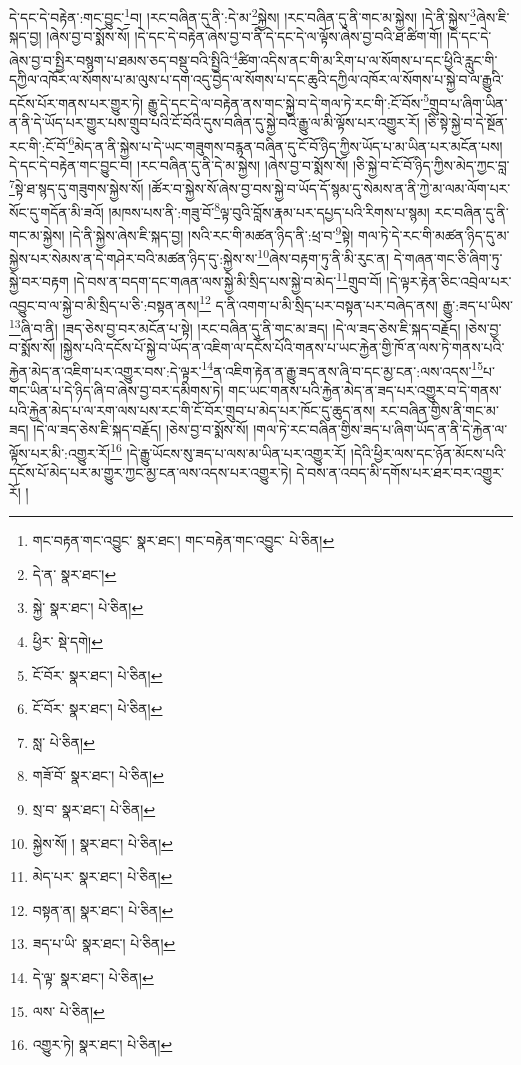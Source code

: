 དེ་དང་དེ་བརྟེན་:གང་བྱུང་\footnote{གང་བརྟན་གང་འབྱུང་  སྣར་ཐང་། གང་བརྟེན་གང་འབྱུང་  པེ་ཅིན། }བ། །རང་བཞིན་དུ་ནི་:དེ་མ་\footnote{དེ་ན་  སྣར་ཐང་། }སྐྱེས། །རང་བཞིན་དུ་ནི་གང་མ་སྐྱེས། །དེ་ནི་སྐྱེས་\footnote{སྐྱེ་  སྣར་ཐང་།  པེ་ཅིན། }ཞེས་ཇི་སྐད་བྱ། །ཞེས་བྱ་བ་སྨོས་སོ། །དེ་དང་དེ་བརྟེན་ཞེས་བྱ་བ་ནི་དེ་དང་དེ་ལ་ལྟོས་ཞེས་བྱ་བའི་ཐ་ཚིག་གོ། །དེ་དང་དེ་ཞེས་བྱ་བ་སྤྱིར་བསྙག་པ་ཐམས་ཅད་བསྡུ་བའི་སྤྱིའི་\footnote{ཕྱིར་  སྡེ་དགེ། }ཚིག་འདིས་ནང་གི་མ་རིག་པ་ལ་སོགས་པ་དང་ཕྱིའི་རླུང་གི་དཀྱིལ་འཁོར་ལ་སོགས་པ་མ་ལུས་པ་དག་འདུ་བྱེད་ལ་སོགས་པ་དང་ཆུའི་དཀྱིལ་འཁོར་ལ་སོགས་པ་སྐྱེ་བ་ལ་རྒྱུའི་དངོས་པོར་གནས་པར་གྱུར་ཏེ། རྒྱུ་དེ་དང་དེ་ལ་བརྟེན་ནས་གང་སྐྱེ་བ་དེ་གལ་ཏེ་རང་གི་:ངོ་བོས་\footnote{ངོ་བོར་  སྣར་ཐང་།  པེ་ཅིན། }གྲུབ་པ་ཞིག་ཡིན་ན་ནི་དེ་ཡོད་པར་གྱུར་པས་གྲུབ་པའི་ངོ་བོའི་དུས་བཞིན་དུ་སྐྱེ་བའི་རྒྱུ་ལ་མི་ལྟོས་པར་འགྱུར་རོ། །ཅི་སྟེ་སྐྱེ་བ་དེ་སྔོན་རང་གི་:ངོ་བོ་\footnote{ངོ་བོར་  སྣར་ཐང་།  པེ་ཅིན། }མེད་ན་ནི་སྐྱེས་པ་དེ་ཡང་གཟུགས་བརྙན་བཞིན་དུ་ངོ་བོ་ཉིད་ཀྱིས་ཡོད་པ་མ་ཡིན་པར་མངོན་པས། དེ་དང་དེ་བརྟེན་གང་བྱུང་བ། །རང་བཞིན་དུ་ནི་དེ་མ་སྐྱེས། །ཞེས་བྱ་བ་སྨོས་སོ། །ཅི་སྐྱེ་བ་ངོ་བོ་ཉིད་ཀྱིས་མེད་ཀྱང་བླ་\footnote{སླ་  པེ་ཅིན། }སྟེ་ཐ་སྙད་དུ་གཟུགས་སྐྱེས་སོ། །ཚོར་བ་སྐྱེས་སོ་ཞེས་བྱ་བས་སྐྱེ་བ་ཡོད་དོ་སྙམ་དུ་སེམས་ན་ནི་ཀྱེ་མ་ལམ་ལོག་པར་སོང་དུ་གདོན་མི་ཟའོ། །མཁས་པས་ནི་:གཟུ་བོ་\footnote{གཟོ་བོ་  སྣར་ཐང་།  པེ་ཅིན། }ལྟ་བུའི་བློས་རྣམ་པར་དཔྱད་པའི་རིགས་པ་སྙམ། རང་བཞིན་དུ་ནི་གང་མ་སྐྱེས། །དེ་ནི་སྐྱེས་ཞེས་ཇི་སྐད་བྱ། །སའི་རང་གི་མཚན་ཉིད་ནི་:ཕྲ་བ་\footnote{སྲ་བ་  སྣར་ཐང་།  པེ་ཅིན། }སྟེ། གལ་ཏེ་དེ་རང་གི་མཚན་ཉིད་དུ་མ་སྐྱེས་པར་སེམས་ན་དེ་གཤེར་བའི་མཚན་ཉིད་དུ་:སྐྱེས་ས་\footnote{སྐྱེས་སོ། །  སྣར་ཐང་།  པེ་ཅིན། }ཞེས་བརྟག་ཏུ་ནི་མི་རུང་ན། དེ་གཞན་གང་ཅི་ཞིག་ཏུ་སྐྱེ་བར་བརྟག །དེ་བས་ན་བདག་དང་གཞན་ལས་སྐྱེ་མི་སྲིད་པས་སྐྱེ་བ་མེད་\footnote{མེད་པར་  སྣར་ཐང་།  པེ་ཅིན། }གྲུབ་བོ། །དེ་ལྟར་རྟེན་ཅིང་འབྲེལ་པར་འབྱུང་བ་ལ་སྐྱེ་བ་མི་སྲིད་པ་ཅི་:བསྟན་ནས།\footnote{བསྟན་ན།  སྣར་ཐང་།  པེ་ཅིན། } ད་ནི་འགག་པ་མི་སྲིད་པར་བསྟན་པར་བཞེད་ནས། རྒྱུ་:ཟད་པ་ཡིས་\footnote{ཟད་པ་ཡི་  སྣར་ཐང་།  པེ་ཅིན། }ཞི་བ་ནི། །ཟད་ཅེས་བྱ་བར་མངོན་པ་སྟེ། །རང་བཞིན་དུ་ནི་གང་མ་ཟད། །དེ་ལ་ཟད་ཅེས་ཇི་སྐད་བརྗོད། །ཅེས་བྱ་བ་སྨོས་སོ། །སྐྱེས་པའི་དངོས་པོ་སྐྱེ་བ་ཡོད་ན་འཇིག་ལ་དངོས་པོའི་གནས་པ་ཡང་རྐྱེན་གྱི་ཁོ་ན་ལས་ཏེ་གནས་པའི་རྐྱེན་མེད་ན་འཇིག་པར་འགྱུར་བས་:དེ་ལྟར་\footnote{དེ་ལྟ་  སྣར་ཐང་།  པེ་ཅིན། }ན་འཇིག་རྟེན་ན་རྒྱུ་ཟད་ནས་ཞི་བ་དང་མྱ་ངན་:ལས་འདས་\footnote{ལས་  པེ་ཅིན། }པ་གང་ཡིན་པ་དེ་ཉིད་ཞི་བ་ཞེས་བྱ་བར་དམིགས་ཏེ། གང་ཡང་གནས་པའི་རྐྱེན་མེད་ན་ཟད་པར་འགྱུར་བ་དེ་གནས་པའི་རྐྱེན་མེད་པ་ལ་རག་ལས་པས་རང་གི་ངོ་བོར་གྲུབ་པ་མེད་པར་ཁོང་དུ་ཆུད་ནས། རང་བཞིན་གྱིས་ནི་གང་མ་ཟད། །དེ་ལ་ཟད་ཅེས་ཇི་སྐད་བརྗོད། །ཅེས་བྱ་བ་སྨོས་སོ། །གལ་ཏེ་རང་བཞིན་གྱིས་ཟད་པ་ཞིག་ཡོད་ན་ནི་དེ་རྐྱེན་ལ་ལྟོས་པར་མི་:འགྱུར་རོ།\footnote{འགྱུར་ཏེ།  སྣར་ཐང་།  པེ་ཅིན། } །དེ་རྒྱུ་ཡོངས་སུ་ཟད་པ་ལས་མ་ཡིན་པར་འགྱུར་རོ། །དེའི་ཕྱིར་ལས་དང་ཉོན་མོངས་པའི་དངོས་པོ་མེད་པར་མ་གྱུར་ཀྱང་མྱ་ངན་ལས་འདས་པར་འགྱུར་ཏེ། དེ་བས་ན་འབད་མི་དགོས་པར་ཐར་བར་འགྱུར་རོ། །

